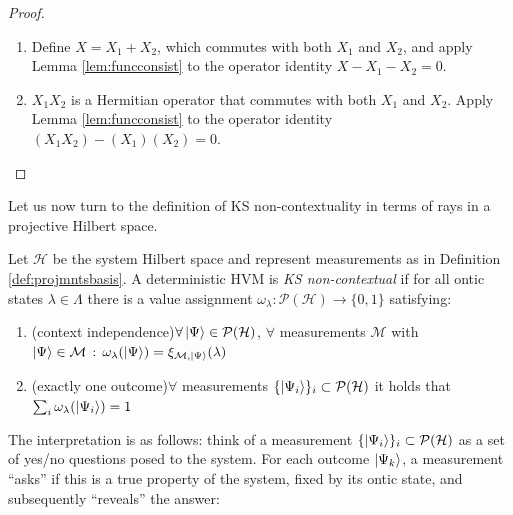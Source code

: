 \begin{proof}\hfill
\begin{enumerate}
\item{Define $X=X_1+X_2$, which commutes with both $X_1$ and $X_2$, and apply Lemma \ref{lem:funcconsist} to the operator identity $X-X_1-X_2=0$.}
\item{$X_1X_2$ is a Hermitian operator that commutes with both $X_1$ and $X_2$. Apply Lemma \ref{lem:funcconsist} to the operator identity $(X_1X_2)-(X_1)(X_2)=0$.}
\end{enumerate}
\end{proof}
Let us now turn to the definition of KS non-contextuality in terms of rays in a projective Hilbert space.

\begin{definition}
\label{def:kscontbasis}
Let $\mathcal{H}$ be the system Hilbert space and represent measurements as in Definition \ref{def:projmntsbasis}. A deterministic HVM is \emph{KS non-contextual} if for all ontic states $\lambda\in\Lambda$ there is a value assignment $\omega_{\lambda}:\mathcal{P}(\mathcal{H})\rightarrow\{0,1\}$ satisfying:
\begin{enumerate}
    \item (context independence)\hfill\break$\forall\ket{\Psi} \in\mathcal{P}(\mathcal{H})$, $\forall$ measurements $\mathcal{M}$ with $\ket{\Psi} \in\mathcal{M}\thinspace:\thinspace \omega_{\lambda}(\ket{\Psi} )=\xi_{\mathcal{M},\ket{\Psi} }(\lambda)$
    \item (exactly one outcome)\hfill\break $\forall$ measurements $\{\ket{\Psi_{i}} \}_{i}\subset\mathcal{P}(\mathcal{H})$ it holds that $\sum_{i}\omega_{\lambda}(\ket{\Psi_{i}})=1$
\end{enumerate}
\end{definition}

The interpretation is as follows: think of a measurement $\{\ket{\Psi_{i}} \}_{i}\subset\mathcal{P}(\mathcal{H})$ as a set of yes/no questions posed to the system. For each outcome $\ket{\Psi_{k}}$, a measurement ``asks” if this is a true property of the system, fixed by its ontic state, and subsequently ``reveals” the answer:

